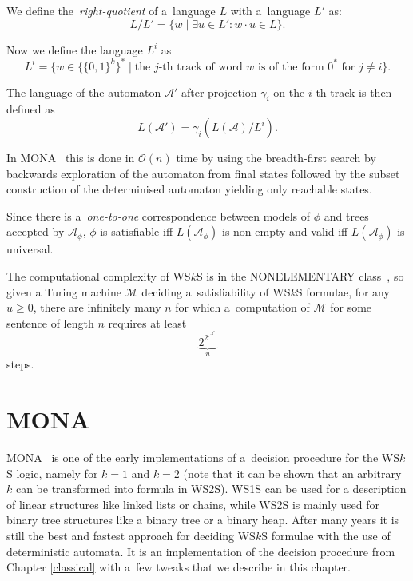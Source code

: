 \begin{defz}
We define the~\emph{right-quotient} of a~language $L$ with a~language $L'$ as:
\begin{equation}
 L / L' = \{w \mid \exists u \in L' : w\cdot u \in L\}.
\end{equation}
\end{defz}

\noindent Now we define the language $L^i$ as
\begin{equation}
 L^i = \{w \in \{\{0, 1\}^k\}^* \mid \text{the $j$-th track of word } \mathit{w}
 \text{ is of the form $0^*$ for $j \neq i$}\}. \end{equation}
 
 The language of the automaton $\mathcal{A}'$ after projection $\gamma_i$ on
 the $i$-th track is then defined as
 \begin{equation}
  L(\mathcal{A}') = \gamma_i(L(\mathcal{A}) / L^i).
 \end{equation}
 
 In \textsc{MONA}~\cite{mona} this is done in $\mathcal{O}(n)$ time by using
 the breadth-first search by backwards exploration of the automaton from final
 states followed by the subset construction of the determinised automaton
 yielding only reachable states.

\begin{prop}
 Since there is a~\emph{one-to-one} correspondence between models of $\phi$ and
 trees accepted by $\mathcal{A}_\phi$, $\phi$ is satisfiable iff
 $L(\mathcal{A}_\phi)$ is non-empty and valid iff $L(\mathcal{A}_\phi)$  is
 universal.
\end{prop}

The computational complexity of WS$k$S is in the NONELEMENTARY
class~\cite{wsksisnonelementary}, so given a Turing machine $\mathcal{M}$ deciding a~satisfiability of WS$k$S formulae, for
any $u \geq 0$, there are infinitely many $n$ for which a~computation of
$\mathcal{M}$ for some sentence of length $n$ requires at least
$$\underbrace{2^{2^{\iddots^{2^n}}}}_u$$ steps.
	
\chapter{\textsc{MONA}}\label{monachap}

 \textsc{MONA}~\cite{mona} is one of the early implementations of a~decision
 procedure for the WS$k$S logic, namely for $k = 1$ and $k = 2$ (note that it
 can be shown that an arbitrary $k$ can be transformed into formula in WS2S).
 WS1S can be used for a description of linear structures like linked lists or
 chains, while WS2S is mainly used for binary tree structures like a binary tree
 or a binary heap. After many years it is still the best and fastest approach
 for deciding WS$k$S formulae with the use of deterministic automata. It is an
 implementation of the decision procedure from Chapter \ref{classical} with a~few tweaks that we
 describe in this chapter.

